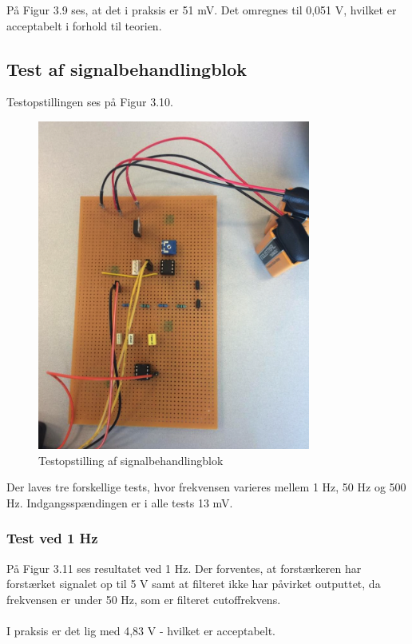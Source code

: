 På Figur 3.9 ses, at det i praksis er 51 mV. Det omregnes til 0,051 V, hvilket er acceptabelt i forhold til teorien. 

\subsection{Test af signalbehandlingblok}

Testopstillingen ses på Figur 3.10. 

\begin{figure}[H]
	\centering
	\includegraphics[width=0.8\textwidth]{Figurer/Snip20151207_46}
	\caption{Testopstilling af signalbehandlingblok}
	\label{fig:Signalbehanlding}
\end{figure}

Der laves tre forskellige tests, hvor frekvensen varieres mellem 1 Hz, 50 Hz og 500 Hz. Indgangsspændingen er i alle tests 13 mV. 
\\
\subsubsection{Test ved 1 Hz}
På Figur 3.11 ses resultatet ved 1 Hz. Der forventes, at forstærkeren har forstærket signalet op til 5 V samt at filteret ikke har påvirket outputtet, da frekvensen er under 50 Hz, som er filteret cutoffrekvens.
\\ \\
I praksis er det lig med 4,83 V - hvilket er acceptabelt.  
 
